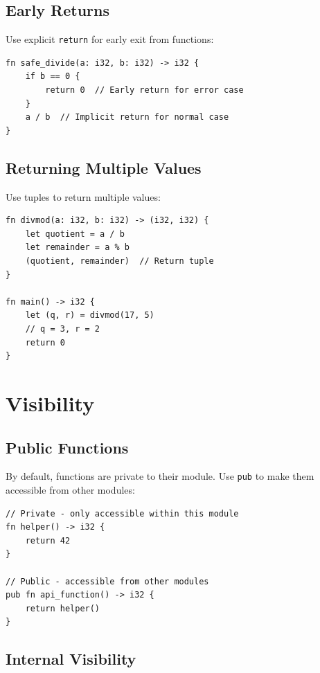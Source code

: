 \subsection{Early Returns}
\label{subsec:early-returns}

Use explicit \texttt{return} for early exit from functions:

\begin{lstlisting}
fn safe_divide(a: i32, b: i32) -> i32 {
    if b == 0 {
        return 0  // Early return for error case
    }
    a / b  // Implicit return for normal case
}
\end{lstlisting}

\subsection{Returning Multiple Values}
\label{subsec:multiple-returns}

Use tuples to return multiple values:

\begin{lstlisting}
fn divmod(a: i32, b: i32) -> (i32, i32) {
    let quotient = a / b
    let remainder = a % b
    (quotient, remainder)  // Return tuple
}

fn main() -> i32 {
    let (q, r) = divmod(17, 5)
    // q = 3, r = 2
    return 0
}
\end{lstlisting}

\section{Visibility}
\label{sec:function-visibility}

\subsection{Public Functions}
\label{subsec:public-functions}

By default, functions are private to their module. Use \texttt{pub} to make them accessible from other modules:

\begin{lstlisting}
// Private - only accessible within this module
fn helper() -> i32 {
    return 42
}

// Public - accessible from other modules
pub fn api_function() -> i32 {
    return helper()
}
\end{lstlisting}

\subsection{Internal Visibility}
\label{subsec:internal-visibility}

